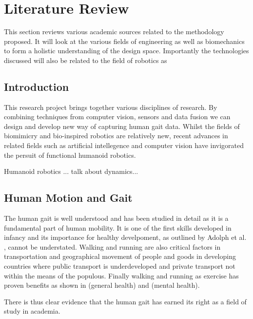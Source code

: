 \chapter{Literature Review}
This section reviews various academic sources related to the methodology proposed. It will look at the various fields of engineering as well as biomechanics to form a holistic understanding of the design space. Importantly the technologies discussed will also be related to the field of robotics as  




\section{Introduction}
This research project brings together various disciplines of research. By combining techniques from computer vision, sensors and data fusion we can design and develop new way of capturing human gait data. Whilst the fields of biomimicry and bio-inspired robotics are relatively new, recent advances in related fields such as artificial intellegence and computer vision have invigorated the persuit of functional humanoid robotics. 

Humanoid robotics \cite{kaneko2002design}   ... talk about dynamics...






\section{Human Motion and Gait}
The human gait is well understood and has been studied in detail as it is a fundamental part of human mobility. It is one of the first skills developed in infancy and its importance for healthy develpoment, as outlined by Adolph et al. \cite{adolph2013road}, cannot be understated. Walking and running are also critical factors in transportation and geographical movement of people and goods in developing countries where public transport is underdeveloped and private transport not within the means of the populous. Finally walking and running as exercise has proven benefits as shown in \cite{hanson2015there} (general health) and \cite{fox1999influence} (mental health).     

There is thus clear evidence that the human gait has earned its right as a field of study in academia.









